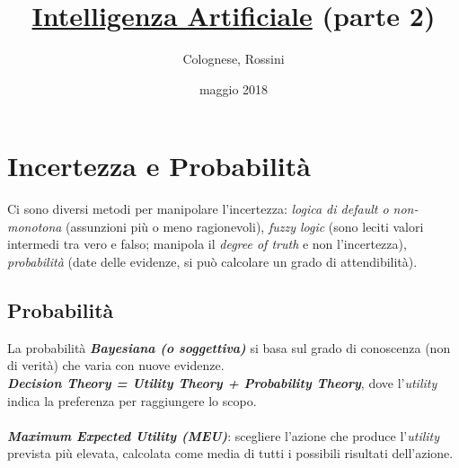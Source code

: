 \documentclass[a4paper, notitlepage, 9pt]{extreport}
\makeatletter
\newcommand*{\toccontents}{\@starttoc{toc}}
\makeatother
\begin{document}
	\title{\textbf{\underline{Intelligenza Artificiale}} (parte 2)}
	\date{maggio 2018}
	\author{Colognese, Rossini}
	\maketitle
	
	\toccontents

\chapter*{Incertezza e Probabilità}
Ci sono diversi metodi per manipolare l'incertezza: \textit{logica di default o non-monotona} (assunzioni più o meno ragionevoli), \textit{fuzzy logic} (sono leciti valori intermedi tra vero e falso; manipola il \textit{degree of truth} e non l'incertezza), \textit{probabilità} (date delle evidenze, si può calcolare un grado di attendibilità).


\section*{Probabilità}
La probabilità \textit{\textbf{Bayesiana (o soggettiva)}} si basa sul grado di conoscenza (non di verità) che varia con nuove evidenze.\\
\textit{\textbf{Decision Theory = Utility Theory + Probability Theory}}, dove l'\textit{utility} indica la preferenza per raggiungere lo scopo.\\\\
\textit{\textbf{Maximum Expected Utility (MEU)}}: scegliere l'azione che produce l'\textit{utility} prevista più elevata, calcolata come media di tutti i possibili risultati dell'azione.
\end{document}

